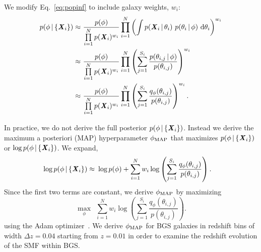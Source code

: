 We modify Eq.~\ref{eq:popinf} to include galaxy weights, $w_i$: 
\begin{align}
p(\phi \,|\, \{{\textbf{\textit{X}}_i}\}) 
    \approx&~\frac{p(\phi)}{\prod\limits_{i=1}^N p({\textbf{\textit{X}}_i})^{w_i}} 
    \prod\limits_{i=1}^N \left(\int p({\textbf{\textit{X}}_i} \,|\, \theta_i)~p(\theta_i \,|\, \phi)~{\rm d}\theta_i \right)^{w_i} \\ 
    \approx&~\frac{p(\phi)}{\prod\limits_{i=1}^N p({\textbf{\textit{X}}_i})^{w_i}} 
    \prod\limits_{i=1}^N \left( \sum\limits_{j=1}^{S_i}
    \frac{p(\theta_{i,j} \,|\, \phi)}{p(\theta_{i,j})} \right)^{w_i} \\
    \approx&~\frac{p(\phi)}{\prod\limits_{i=1}^N p({\textbf{\textit{X}}_i})^{w_i}} 
    \prod\limits_{i=1}^N \left( \sum\limits_{j=1}^{S_i}
    \frac{q_\phi(\theta_{i,j})}{p(\theta_{i,j})} \right)^{w_i}.
\end{align} 

In practice, we do not derive the full posterior 
$p(\phi \,|\, \{{\textbf{\textit{X}}_i}\})$. 
Instead we derive the maximum a posteriori (MAP) hyperparameter 
$\phi_{\rm MAP}$ that maximizes $p(\phi \,|\, \{{\textbf{\textit{X}}_i}\})$ or 
$\log p(\phi \,|\, \{{\textbf{\textit{X}}_i}\})$.
We expand, 
\begin{align}
\log p(\phi \given \{{\bfi X_i}\}) 
    \approx&~\log p(\phi) + %
    \sum\limits_{i=1}^N w_i \log \left(\sum\limits_{j=1}^{S_i} \frac{q_\phi(\theta_{i,j})}{p(\theta_{i,j})} \right).
\end{align} 
Since the first two terms are constant, we derive $\phi_{\rm MAP}$ by
maximizing 
\begin{equation}
    \max_\phi~~\sum\limits_{i=1}^N w_i \log \left(\sum\limits_{j=1}^{S_i} \frac{q_\phi(\theta_{i,j})}{p(\theta_{i,j})} \right).
\end{equation}
using the {\sc Adam} optimizer~\citep{kingma2017}.  
We derive $\phi_{\rm MAP}$ for BGS galaxies in redshift bins of width 
$\Delta z = 0.04$ starting from $z =0.01$ in order to examine the redshift
evolution of the SMF within BGS. 


